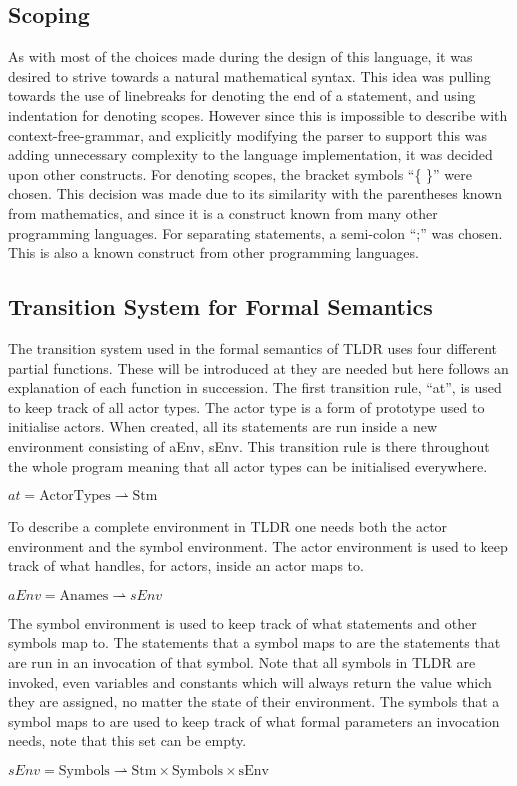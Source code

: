 \subsection{Scoping}

As with most of the choices made during the design of this language, it was desired to strive towards a natural mathematical syntax. This idea was pulling towards the use of linebreaks for denoting the end of a statement, and using indentation for denoting scopes. However since this is impossible to describe with context-free-grammar, and explicitly modifying the parser to support this was adding unnecessary complexity to the language implementation, it was decided upon other constructs.
For denoting scopes, the bracket symbols \enquote{\{ \}} were chosen. This decision was made due to its similarity with the parentheses known from mathematics, and since it is a construct known from many other programming languages. For separating statements, a semi-colon \enquote{;} was chosen. This is also a known construct from other programming languages.


\subsection{Transition System for Formal Semantics}
The transition system used in the formal semantics of TLDR uses four different partial functions. These will be introduced at they are needed but here follows an explanation of each function in succession.
The first transition rule, \enquote{at}, is used to keep track of all actor types. The actor type is a form of prototype used to initialise actors. When created, all its statements are run inside a new environment consisting of aEnv, sEnv. This transition rule is there throughout the whole program meaning that all actor types can be initialised everywhere.
\begin{center}
$at = \text{ActorTypes} \rightharpoonup \text{Stm}$
\end{center}
To describe a complete environment in TLDR one needs both the actor environment and the symbol environment. The actor environment is used to keep track of what handles, for actors, inside an actor maps to.
\begin{center}
$aEnv = \text{Anames} \rightharpoonup sEnv$
\end{center}
The symbol environment is used to keep track of what statements and other symbols map to. The statements that a symbol maps to are the statements that are run in an invocation of that symbol. Note that all symbols in TLDR are invoked, even variables and constants which will always return the value which they are assigned, no matter the state of their environment. The symbols that a symbol maps to are used to keep track of what formal parameters an invocation needs, note that this set can be empty.
\begin{center}
$sEnv = \text{Symbols} \rightharpoonup \text{Stm} \times \text{Symbols} \times \text{sEnv}$
\end{center}

